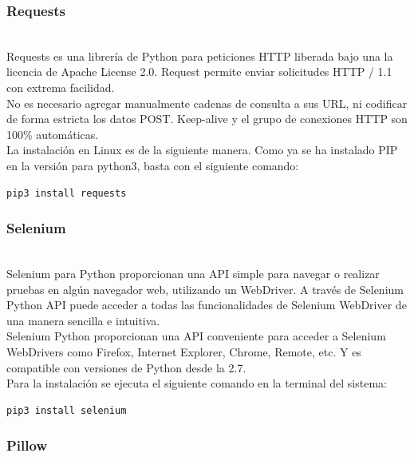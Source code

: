 {{\subsubsection{Requests}\\

\noindent Requests es una librería de Python para peticiones HTTP liberada bajo una la licencia de Apache License 2.0.  Request permite enviar solicitudes HTTP / 1.1 con extrema facilidad.\\ 

\noindent No es necesario agregar manualmente cadenas de consulta a sus URL, ni codificar de forma estricta los datos POST. Keep-alive y el grupo de conexiones HTTP son 100\% automáticas.\\

\noindent La instalación en Linux es de la siguiente manera. Como ya se ha instalado PIP en la versión para python3, basta con el siguiente comando:\\

\begin{lstlisting}
pip3 install requests
\end{lstlisting}

\subsubsection{Selenium}\\

\noindent Selenium para Python proporcionan una API simple para navegar o realizar pruebas en algún navegador web, utilizando un WebDriver. A través de Selenium Python API puede acceder a todas las funcionalidades de Selenium WebDriver de una manera sencilla e intuitiva.\\
Selenium Python proporcionan una API conveniente para acceder a Selenium WebDrivers como Firefox, Internet Explorer, Chrome, Remote, etc. Y es compatible con versiones de Python desde la 2.7.\\

\noindent
Para la instalación se ejecuta el siguiente comando en la terminal del sistema:
\begin{lstlisting}
pip3 install selenium
\end{lstlisting}

\subsubsection{Pillow}\\

}}
